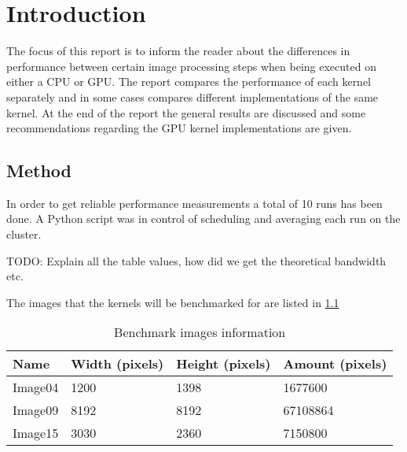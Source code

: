 \documentclass[final]{report}
\begin{document}
\chapter{Introduction}

The focus of this report is to inform the reader about the differences in performance between certain image processing steps when being executed on either a CPU or GPU.
The report compares the performance of each kernel separately and in some cases compares different implementations of the same kernel.
At the end of the report the general results are discussed and some recommendations regarding the GPU kernel implementations are given.

\section{Method}
In order to get reliable performance measurements a total of 10 runs has been done.
A Python script was in control of scheduling and averaging each run on the cluster.

TODO: Explain all the table values, how did we get the theoretical bandwidth etc.

The images that the kernels will be benchmarked for are listed in \cref{tab:image-information}

\begin{table}[H]
	\centering
	\caption{Benchmark images information}
	\label{tab:image-information}
	\begin{tabular}{llll}
		\toprule
			\textbf{Name} &\textbf{Width (pixels)} & \textbf{Height (pixels)} & \textbf{Amount (pixels)}\\
		\midrule
			Image04 & 1200				& 1398				& 1677600 \\
			Image09 & 8192 				& 8192 				& 67108864 \\
			Image15 & 3030 				& 2360 				& 7150800\\
		\bottomrule
	\end{tabular}
\end{table}

\end{document}

